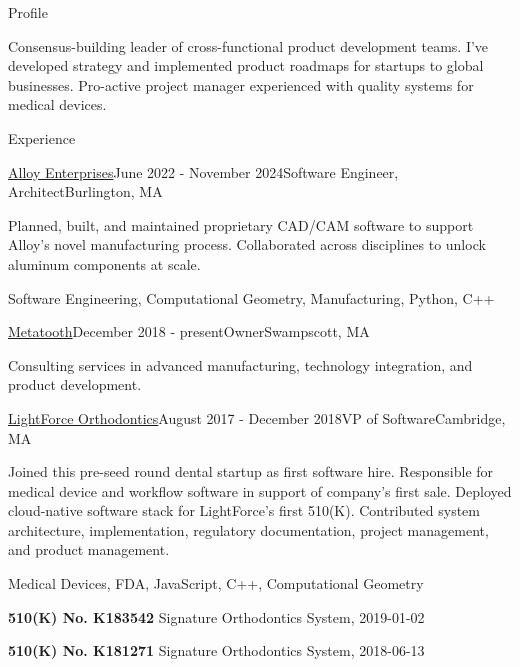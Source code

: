 \documentclass{resume}
\begin{document}
  
\begin{rSection}{Profile}
\item Consensus-building leader of cross-functional product development teams. I've developed strategy and implemented product roadmaps for startups to global businesses. Pro-active project manager experienced with quality systems for medical devices.
\end{rSection}

\begin{rSection}{Experience}

\begin{rSubsection}{\href{https://alloyenterprises.co}{Alloy Enterprises}}{June 2022 - November 2024}{Software Engineer, Architect}{Burlington, MA}
\item Planned, built, and maintained proprietary CAD/CAM software to support Alloy's novel manufacturing process. Collaborated across disciplines to unlock aluminum components at scale.
\item Software Engineering, Computational Geometry, Manufacturing, Python, C++
\end{rSubsection}

\begin{rSubsection}{\href{https://metatooth.com}{Metatooth}}{December 2018 - present}{Owner}{Swampscott, MA}
\item Consulting services in advanced manufacturing, technology integration, and product development.
\end{rSubsection}

\begin{rSubsection}{\href{https://lightforceortho.com}{LightForce Orthodontics}}{August 2017 - December 2018}{VP of Software}{Cambridge, MA}
\item Joined this pre-seed round dental startup as first software hire. Responsible for medical device and workflow software in support of company's first sale. Deployed cloud-native software stack for LightForce's first 510(K). Contributed system architecture, implementation, regulatory documentation, project management, and product management.
\item Medical Devices, FDA, JavaScript, C++, Computational Geometry
\item \textbf{510(K) No. K183542} Signature Orthodontics System, 2019-01-02
\item \textbf{510(K) No. K181271} Signature Orthodontics System, 2018-06-13
\end{rSubsection}



\end{rSection}
\end{document}
